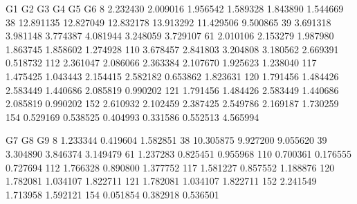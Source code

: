 \documentclass[letterpaper,10pt,english]{jupyterBook}
\begin{document}
\begin{sphinxVerbatim}[commandchars=\\\{\}]
  
\end{sphinxVerbatim}

\begin{sphinxVerbatim}[commandchars=\\\{\}]
\PYG{p}{[}\PYG{p}{]}
\end{sphinxVerbatim}

\begin{sphinxVerbatim}[commandchars=\\\{\}]
            G1         G2         G3         G4         G5        G6  \PYGZbs{}
8     2.232430   2.009016   1.956542   1.589328   1.843890  1.544669   
38   12.891135  12.827049  12.832178  13.913292  11.429506  9.500865   
39    3.691318   3.981148   3.774387   4.081944   3.248059  3.729107   
61    2.010106   2.153279   1.987980   1.863745   1.858602  1.274928   
110   3.678457   2.841803   3.204808   3.180562   2.669391  0.518732   
112   2.361047   2.086066   2.363384   2.107670   1.925623  1.238040   
117   1.475425   1.043443   2.154415   2.582182   0.653862  1.823631   
120   1.791456   1.484426   2.583449   1.440686   2.085819  0.990202   
121   1.791456   1.484426   2.583449   1.440686   2.085819  0.990202   
152   2.610932   2.102459   2.387425   2.549786   2.169187  1.730259   
154  \PYGZhy{}0.529169  \PYGZhy{}0.538525  \PYGZhy{}0.404993  \PYGZhy{}0.331586  \PYGZhy{}0.552513  4.565994   

            G7        G8        G9  
8     1.233344  0.419604  1.582851  
38   10.305875  9.927200  9.055620  
39    3.304890  3.846374  3.149479  
61    1.237283  0.825451  0.955968  
110   0.700361  0.176555  0.727694  
112   1.766328  0.890800  1.377752  
117   1.581227  0.857552  1.188876  
120   1.782081  1.034107  1.822711  
121   1.782081  1.034107  1.822711  
152   2.241549  1.713958  1.592121  
154  \PYGZhy{}0.051854 \PYGZhy{}0.382918 \PYGZhy{}0.536501  
\end{sphinxVerbatim}

\begin{sphinxVerbatim}[commandchars=\\\{\}]
\PYG{p}{[}\PYG{p}{]}
\end{sphinxVerbatim}
\end{document}
